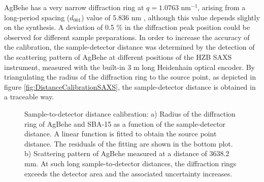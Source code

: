 AgBehe has a very narrow diffraction ring at $q=1.0763$ nm$^{-1}$, arising from a long-period spacing ($d_{001}$) value of 5.836 nm \citep{blanton_jcpdsinternational_1995}, although this value depends slightly on the synthesis. A deviation of 0.5 $\%$ in the diffraction peak position could be observed for different sample preparations. In order to increase the accuracy of the calibration, the sample-detector distance was determined by the detection of the scattering pattern of AgBehe at different positions of the HZB SAXS instrument, measured with the built-in 3 m long Heidenhain optical encoder. By triangulating the radius of the diffraction ring to the source point, as depicted in figure \ref{fig:DistanceCalibrationSAXS}, the sample-detector distance is obtained in a traceable way.

\begin{figure}
	\centering
                \qquad
		\caption[Sample-to-detector distance calibration and scattering pattern of AgBehe at large distance.]{Sample-to-detector distance calibration: a) Radius of the diffraction ring of AgBehe and SBA-15 as a function of the sample-detector distance. A linear function is fitted to obtain the source point distance. The residuals of the fitting are shown in the bottom plot. b) Scattering pattern of AgBehe measured at a distance of 3638.2 mm. At such long sample-to-detector distances, the diffraction rings exceeds the detector area and the associated uncertainty increases.}
\end{figure}

